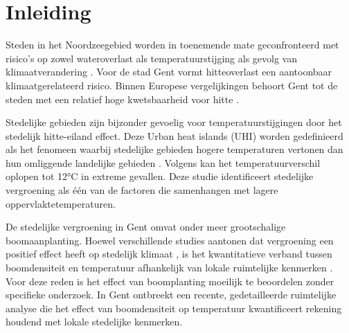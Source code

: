 


% 

\section{Inleiding}%
\label{sec:inleiding}

Steden in het Noordzeegebied worden in toenemende mate geconfronteerd met risico's op zowel wateroverlast als temperatuurstijging 
als gevolg van klimaatverandering \autocite{EEA2020}.
Voor de stad Gent vormt hitteoverlast een aantoonbaar klimaatgerelateerd risico.
Binnen Europese vergelijkingen behoort Gent tot de steden met een relatief hoge kwetsbaarheid voor hitte \autocite{Tapia2017}.

Stedelijke gebieden zijn bijzonder gevoelig voor temperatuurstijgingen door het stedelijk hitte-eiland effect.
Deze Urban heat islands (UHI) worden gedefinieerd als het fenomeen waarbij stedelijke gebieden 
hogere temperaturen vertonen dan hun omliggende landelijke gebieden \autocite{Phelan2015}.
Volgens \textcite{Zheng2026} kan het temperatuurverschil oplopen tot 12°C in extreme gevallen.
Deze studie identificeert stedelijke vergroening als één van de factoren die samenhangen met lagere oppervlaktetemperaturen.

De stedelijke vergroening in Gent omvat onder meer grootschalige boomaanplanting.
Hoewel verschillende studies aantonen dat vergroening een positief effect heeft op stedelijk klimaat \autocite{Knight2021, Zheng2026, Phelan2015}, 
is het kwantitatieve verband tussen boomdensiteit en temperatuur afhankelijk van lokale ruimtelijke kenmerken \autocite{Wang2024}.
Voor deze reden is het effect van boomplanting moeilijk te beoordelen zonder specifieke onderzoek.
In Gent ontbreekt een recente, gedetailleerde ruimtelijke analyse die het effect van boomdensiteit op temperatuur 
kwantificeert rekening houdend met lokale stedelijke kenmerken.

